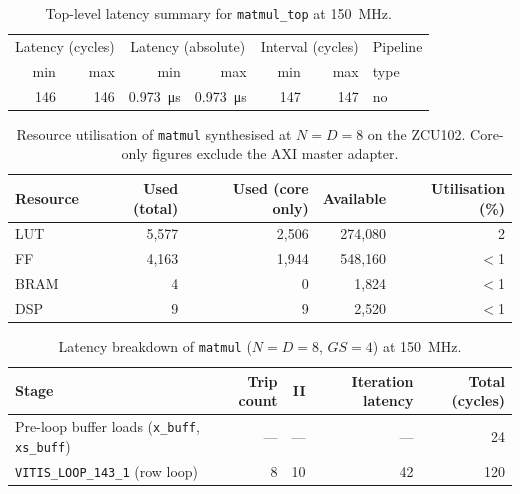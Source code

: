 \begin{table}[H]
  \centering
  \begin{tabular}{rrrrrrl}
    \toprule
    \multicolumn{2}{c}{Latency (cycles)} &
    \multicolumn{2}{c}{Latency (absolute)} &
    \multicolumn{2}{c}{Interval (cycles)} & Pipeline \\
    min & max & min & max & min & max & type \\
    \midrule
    146 & 146 & \SI{0.973}{\micro\second} & \SI{0.973}{\micro\second} & 147 & 147 & no \\
    \bottomrule
  \end{tabular}
  \caption{Top-level latency summary for \texttt{matmul\_top} at
           \SI{150}{\mega\hertz}.}
  \label{tab:matmul_top_latency}

\end{table}

\begin{table}[H]
  \centering
  \begin{tabular}{lrrrr}
    \toprule
    Resource & Used (total) & Used (core only) & Available & Utilisation (\%) \\
    \midrule
    LUT  & 5{,}577 & 2{,}506 & 274{,}080 & 2 \\
    FF   & 4{,}163 & 1{,}944 & 548{,}160 & $<$1 \\
    BRAM & 4       & 0       & 1{,}824   & $<$1 \\
    DSP  & 9       & 9       & 2{,}520   & $<$1 \\
    \bottomrule
  \end{tabular}
  \caption{Resource utilisation of \texttt{matmul} synthesised at $N = D = 8$
           on the ZCU102. Core-only figures exclude the AXI master adapter.}
  \label{tab:matmul_resources}

\end{table}

\begin{table}[H]
  \centering
  \begin{tabular}{lrrrr}
    \toprule
    Stage & Trip count & II & Iteration latency & Total (cycles) \\
    \midrule
    Pre-loop buffer loads (\texttt{x\_buff}, \texttt{xs\_buff}) & — & — & — & 24 \\
    \texttt{VITIS\_LOOP\_143\_1} (row loop)                     & 8 & 10 & 42 & 120 \\
    \bottomrule
  \end{tabular}
  \caption{Latency breakdown of \texttt{matmul} ($N = D = 8$, $GS = 4$)
           at \SI{150}{\mega\hertz}.}
  \label{tab:matmul_latency}

\end{table}

